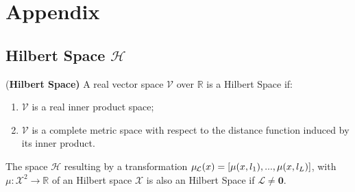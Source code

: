 \appendix
\section{Appendix}

\subsection{Hilbert Space $\mathcal{H}$}
\label{an:hilbert}


\begin{defn}{(\bf{Hilbert Space})}
    A real vector space $\mathcal{V}$ over $\mathbb{R}$ is a Hilbert Space if:
    \begin{enumerate}
        \item $\mathcal{V}$ is a real inner product space;
        \item $\mathcal{V}$ is a complete metric space with respect to the distance function induced by its inner product.
    \end{enumerate}
\end{defn}

\begin{thm}
    The space $\mathcal{H}$ resulting by a transformation $\mul{x} = [\mu(x,l_1),...,\mu(x,l_L)]$, with $\mu : \mathcal{X}^2 \to \mathbb{R}$ of an Hilbert space $\mathcal{X}$ is also an Hilbert Space if $\mathcal{L} \neq \bm{0}$.

\end{thm}


